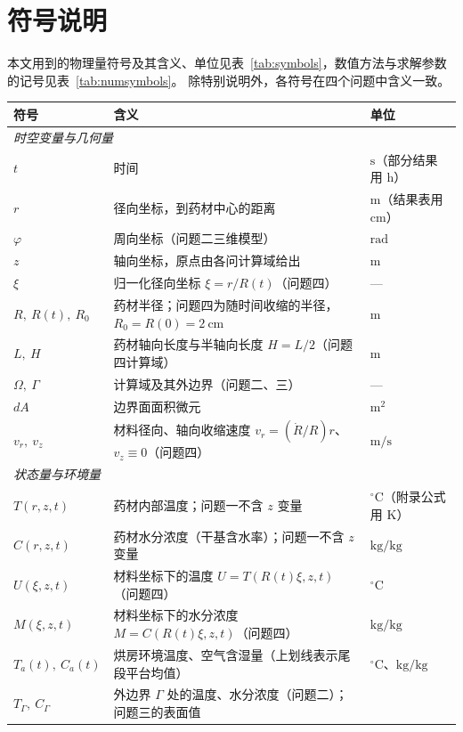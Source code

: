 \documentclass[12pt,a4paper]{ctexart}
\begin{document}
\section{符号说明}
本文用到的物理量符号及其含义、单位见表~\ref{tab:symbols}，数值方法与求解参数的记号见表~\ref{tab:numsymbols}。
除特别说明外，各符号在四个问题中含义一致。

\begin{table}[H]
\centering
\footnotesize
\begin{tabularx}{\textwidth}{@{}lXl@{}}
\toprule
符号 & 含义 & 单位 \\
\midrule
\multicolumn{3}{l}{\textit{时空变量与几何量}}\\
$t$ & 时间 & $\mathrm{s}$（部分结果用 $\mathrm{h}$） \\
$r$ & 径向坐标，到药材中心的距离 & $\mathrm{m}$（结果表用 $\mathrm{cm}$） \\
$\varphi$ & 周向坐标（问题二三维模型） & $\mathrm{rad}$ \\
$z$ & 轴向坐标，原点由各问计算域给出 & $\mathrm{m}$ \\
$\xi$ & 归一化径向坐标 $\xi=r/R(t)$（问题四） & — \\
$R,\ R(t),\ R_0$ & 药材半径；问题四为随时间收缩的半径，$R_0=R(0)=2\ \mathrm{cm}$ & $\mathrm{m}$ \\
$L,\ H$ & 药材轴向长度与半轴向长度 $H=L/2$（问题四计算域） & $\mathrm{m}$ \\
$\Omega,\ \Gamma$ & 计算域及其外边界（问题二、三） & — \\
$dA$ & 边界面面积微元 & $\mathrm{m^2}$ \\
$v_r,\ v_z$ & 材料径向、轴向收缩速度 $v_r=(\dot R/R)r$、$v_z\equiv0$（问题四） & $\mathrm{m/s}$ \\
\midrule
\multicolumn{3}{l}{\textit{状态量与环境量}}\\
$T(r,z,t)$ & 药材内部温度；问题一不含 $z$ 变量 & $^\circ\mathrm{C}$（附录公式用 $\mathrm{K}$） \\
$C(r,z,t)$ & 药材水分浓度（干基含水率）；问题一不含 $z$ 变量 & $\mathrm{kg/kg}$ \\
$U(\xi,z,t)$ & 材料坐标下的温度 $U=T(R(t)\xi,z,t)$（问题四） & $^\circ\mathrm{C}$ \\
$M(\xi,z,t)$ & 材料坐标下的水分浓度 $M=C(R(t)\xi,z,t)$（问题四） & $\mathrm{kg/kg}$ \\
$T_a(t),\ C_a(t)$ & 烘房环境温度、空气含湿量（上划线表示尾段平台均值） & $^\circ\mathrm{C}$、$\mathrm{kg/kg}$ \\
$T_\Gamma,\ C_\Gamma$ & 外边界 $\Gamma$ 处的温度、水分浓度（问题二）；问题三的表面值

\end{tabularx}
\end{table}
\end{document}

